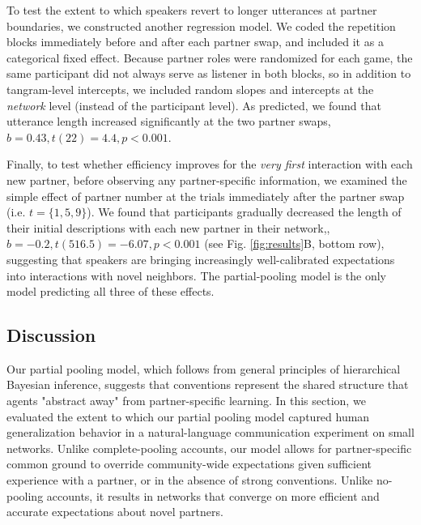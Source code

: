 To test the extent to which speakers revert to longer utterances at partner boundaries, we constructed another regression model.
We coded the repetition blocks immediately before and after each partner swap, and included it as a categorical fixed effect.
Because partner roles were randomized for each game, the same participant did not always serve as listener in both blocks, so in addition to tangram-level intercepts, we included random slopes and intercepts at the \emph{network} level (instead of the participant level).
As predicted, we found that utterance length increased significantly at the two partner swaps, $b = 0.43, t(22) = 4.4, p < 0.001$.

Finally, to test whether efficiency improves for the \emph{very first} interaction with each new partner, before observing any partner-specific information, we examined the simple effect of partner number at the trials immediately after the partner swap (i.e. $t=\{1,5,9\}$).
We found that participants gradually decreased the length of their initial descriptions with each new partner in their network,, $b = -0.2, t(516.5) = -6.07, p < 0.001$ (see Fig. \ref{fig:results}B, bottom row), suggesting that speakers are bringing increasingly well-calibrated expectations into interactions with novel neighbors.
The partial-pooling model is the only model predicting all three of these effects.


\subsection{Discussion}

Our partial pooling model, which follows from general principles of hierarchical Bayesian inference, suggests that conventions represent the shared structure that agents "abstract away" from partner-specific learning.
In this section, we evaluated the extent to which our partial pooling model captured human generalization behavior in a natural-language communication experiment on small networks.
Unlike complete-pooling accounts, our model allows for partner-specific common ground to override community-wide expectations given sufficient experience with a partner, or in the absence of strong conventions.
Unlike no-pooling accounts, it results in networks that converge on more efficient and accurate expectations about novel partners.

